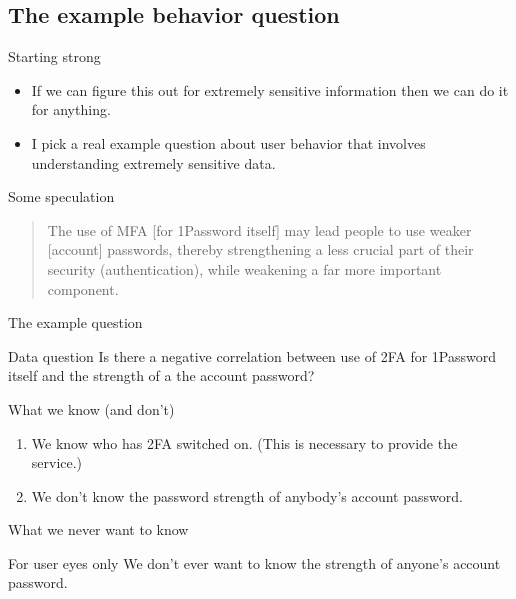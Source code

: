 \documentclass[xcolor={dvipsnames,table,hyperref}]{beamer}
\begin{document}
\subsection{The example behavior question}

\begin{frame}{Starting strong}
  \begin{itemize}
    \item If we can figure this out for extremely sensitive information then we can do it for anything.
    \item I pick a real example question about user behavior that involves understanding extremely sensitive data.
  \end{itemize}
\end{frame}

\begin{frame}{Some speculation}
  \blockcquote{Goldberg18:MFA:pwc}{The use of MFA [for 1Password itself] may lead people to use weaker [account] passwords, thereby strengthening a less crucial part of their security (authentication), while weakening a far more important component.}
\end{frame}

\begin{frame}{The example question}
  \begin{block}{Data question}
    Is there a negative correlation between use of 2FA for 1Password itself and the strength of a the account password?
  \end{block}

\end{frame}

\begin{frame}{What we know (and don't)}
  \begin{enumerate}
    \item We know who has 2FA switched on. (This is necessary to provide the service.)
    \item We don't know the password strength of anybody's account password.
  \end{enumerate}

\end{frame}

\begin{frame}{What we never want to know}
  \begin{alertblock}{For user eyes only}
    We don't ever want to know the strength of anyone's account password.
  \end{alertblock}
\end{frame}
\end{document}
